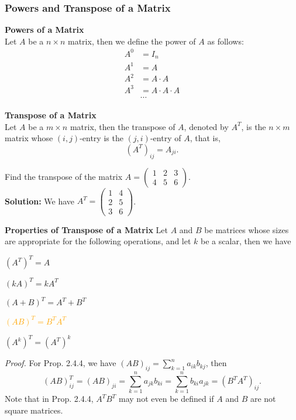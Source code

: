 \documentclass[10pt, a4paper]{article}
\begin{document}
\subsubsection*{Powers and Transpose of a Matrix}
\begin{definition}
    \textbf{Powers of a Matrix}\\
    Let $A$ be a $n\times n$ matrix, then we define the power of $A$ as follows:
    \begin{align*}
        A^0 & = I_n             \\
        A^1 & = A               \\
        A^2 & = A\cdot A        \\
        A^3 & = A\cdot A\cdot A \\
            & \cdots
    \end{align*}
\end{definition}
\begin{definition}
    \textbf{Transpose of a Matrix}\\
    Let $A$ be a $m\times n$ matrix, then the transpose of $A$, denoted by $A^T$, is the $n\times m$ matrix whose $(i,j)$-entry is the $(j,i)$-entry of $A$, that is, $$(A^T)_{ij} = A_{ji}.$$
\end{definition}
\begin{example}
    Find the transpose of the matrix $A = \begin{pmatrix} 1 & 2 & 3 \\ 4 & 5 & 6 \end{pmatrix}$.\\
    \textbf{Solution:} We have $A^T = \begin{pmatrix} 1 & 4 \\ 2 & 5 \\ 3 & 6 \end{pmatrix}$.
\end{example}
\begin{proposition}
    \textbf{Properties of Transpose of a Matrix}
    Let $A$ and $B$ be matrices whose sizes are appropriate for the following operations, and let $k$ be a scalar, then we have
    \begin{enumerate}
        \item $(A^T)^T = A$
        \item $(kA)^T = kA^T$
        \item $(A + B)^T = A^T + B^T$
              \textcolor{Orange}{\item $(AB)^T = B^TA^T$}
        \item $(A^k)^T = (A^T)^k$
    \end{enumerate}
\end{proposition}
\; \; \textit{Proof.} For Prop. 2.4.4, we have $(AB)_{ij} = \sum_{k=1}^n a_{ik}b_{kj}$, then $$(AB)^T_{ij} = (AB)_{ji} = \sum_{k=1}^n a_{jk}b_{ki} = \sum_{k=1}^n b_{ki}a_{jk} = (B^TA^T)_{ij}.$$
Note that in Prop. 2.4.4, $A^T B^T$ may not even be defined if $A$ and $B$ are not square matrices.
\end{document}
